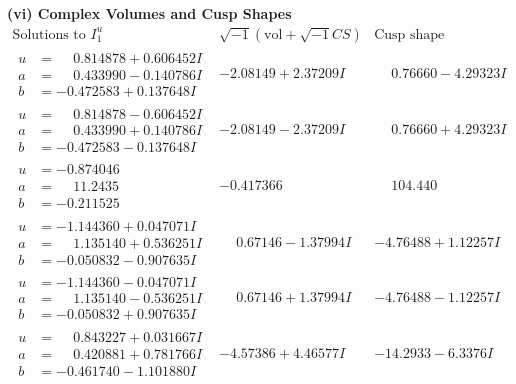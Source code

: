 \documentclass[1p]{elsarticle_modified}
\theoremstyle{definition}
\newcommand{\I}{\sqrt{-1}}
\begin{document}
\newpage\flushleft \textbf{(vi) Complex Volumes and Cusp Shapes}
$$\begin{array}{c|c|c}  
\text{Solutions to }I^u_{1}& \I (\text{vol} + \sqrt{-1}CS) & \text{Cusp shape}\\
 \hline 
\begin{aligned}
u &= \phantom{-}0.814878 + 0.606452 I \\
a &= \phantom{-}0.433990 - 0.140786 I \\
b &= -0.472583 + 0.137648 I\end{aligned}
 & -2.08149 + 2.37209 I & \phantom{-}0.76660 - 4.29323 I \\ \hline\begin{aligned}
u &= \phantom{-}0.814878 - 0.606452 I \\
a &= \phantom{-}0.433990 + 0.140786 I \\
b &= -0.472583 - 0.137648 I\end{aligned}
 & -2.08149 - 2.37209 I & \phantom{-}0.76660 + 4.29323 I \\ \hline\begin{aligned}
u &= -0.874046\phantom{ +0.000000I} \\
a &= \phantom{-}11.2435\phantom{ +0.000000I} \\
b &= -0.211525\phantom{ +0.000000I}\end{aligned}
 & -0.417366\phantom{ +0.000000I} & \phantom{-}104.440\phantom{ +0.000000I} \\ \hline\begin{aligned}
u &= -1.144360 + 0.047071 I \\
a &= \phantom{-}1.135140 + 0.536251 I \\
b &= -0.050832 - 0.907635 I\end{aligned}
 & \phantom{-}0.67146 - 1.37994 I & -4.76488 + 1.12257 I \\ \hline\begin{aligned}
u &= -1.144360 - 0.047071 I \\
a &= \phantom{-}1.135140 - 0.536251 I \\
b &= -0.050832 + 0.907635 I\end{aligned}
 & \phantom{-}0.67146 + 1.37994 I & -4.76488 - 1.12257 I \\ \hline\begin{aligned}
u &= \phantom{-}0.843227 + 0.031667 I \\
a &= \phantom{-}0.420881 + 0.781766 I \\
b &= -0.461740 - 1.101880 I\end{aligned}
 & -4.57386 + 4.46577 I & -14.2933 - 6.3376 I \\ \hline\begin{aligned}

\end{aligned}
\end{array}$$
\end{document}
